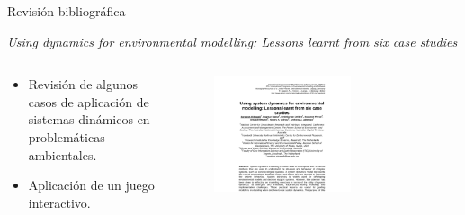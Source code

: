 \documentclass[17pt, t, lualatex]{beamer}
\begin{document}
\begin{frame}{Revisión bibliográfica}

  \begin{block}{\textit{Using dynamics for environmental modelling: Lessons learnt from six case studies}\cite{el2012using}}
  \end{block}

\begin{columns}
  \begin{column}{.5\textwidth}
    \begin{itemize}
      \item Revisión de algunos casos de aplicación de sistemas dinámicos en problemáticas ambientales.
      \item Aplicación de un juego interactivo. 
\end{itemize}
  \end{column}

  \begin{column}{.5\textwidth}
    \begin{figure}[ht]
      \centering
      \includegraphics[width=0.65\textwidth]{img/4.png}
    \end{figure}
  \end{column}
\end{columns}

\end{frame}
\end{document}
